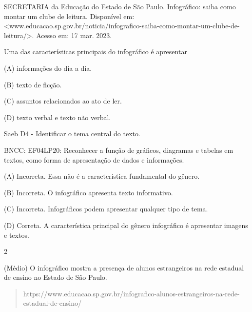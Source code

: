 \begin{itemize}
{{{\begin{itemize}
\begin{itemize}
\begin{itemize}
SECRETARIA da Educação do Estado de São Paulo. Infográfico: saiba como
montar um clube de leitura. Disponível em:
\textless{}www.educacao.sp.gov.br/noticia/infografico-saiba-como-montar-um-clube-de-leitura/\textgreater{}.
Acesso em: 17 mar. 2023.

Uma das características principais do infográfico é apresentar

(A) informações do dia a dia.

(B) texto de ficção.

(C) assuntos relacionados ao ato de ler.

(D) texto verbal e texto não verbal.

Saeb D4 - Identificar o tema central do texto.

BNCC: EF04LP20: Reconhecer a função de gráficos, diagramas e tabelas em
textos, como forma de apresentação de dados e informações.

(A) Incorreta. Essa não é a característica fundamental do gênero.

(B) Incorreta. O infográfico apresenta texto informativo.

(C) Incorreta. Infográficos podem apresentar qualquer tipo de tema.

(D) Correta. A característica principal do gênero infográfico é
apresentar imagens e textos.

\num{2}

(Médio) O infográfico mostra a presença de alunos estrangeiros na rede
estadual de ensino no Estado de São Paulo.

\begin{quote}
https://www.educacao.sp.gov.br/infografico-alunos-estrangeiros-na-rede-estadual-de-ensino/


\end{quote}
\end{itemize}
\end{itemize}
\end{itemize}}}}
\end{itemize}
